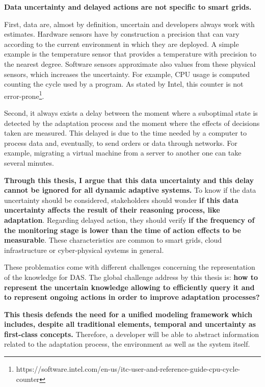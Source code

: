 \bigskip
{}
\textbf{Data uncertainty and delayed actions are not specific to smart grids.}

First, data are, almost by definition, uncertain and developers always work with estimates.
Hardware sensors have by construction a precision that can vary according to the current environment in which they are deployed.
A simple example is the temperature sensor that provides a temperature with precision to the nearest degree.
Software sensors approximate also values from these physical sensors, which increases the uncertainty.
For example, CPU usage is computed counting the cycle used by a program.
As stated by Intel, this counter is not error-prone\footnote{https://software.intel.com/en-us/itc-user-and-reference-guide-cpu-cycle-counter}.

Second, it always exists a delay between the moment where a suboptimal state is detected by the adaptation process and the moment where the effects of decisions taken are measured.
This delayed is due to the time needed by a computer to process data and, eventually, to send orders or data through networks.
For example, migrating a virtual machine from a server to another one can take several minutes.

\textbf{Through this thesis, I argue that this data uncertainty and this delay cannot be ignored for all dynamic adaptive systems.}
To know if the data uncertainty should be considered, stakeholders should wonder \textbf{if this data uncertainty affects the result of their reasoning process, like adaptation}.
Regarding delayed action, they should verify \textbf{if the frequency of the monitoring stage is lower than the time of action effects to be measurable}.
These characteristics are common to smart grids, cloud infrastructure or cyber-physical systems in general.

\bigskip
{}
These problematics come with different challenges concerning the representation of the knowledge for DAS.
The global challenge address by this thesis is: \textbf{how to represent the uncertain knowledge allowing to efficiently query it and to represent ongoing actions in order to improve adaptation processes?}

\bigskip
{}
\textbf{This thesis defends the need for a unified modeling framework which includes, despite all traditional elements, temporal and uncertainty as first-class concepts.}
Therefore, a developer will be able to abstract information related to the adaptation process, the environment as well as the system itself.

